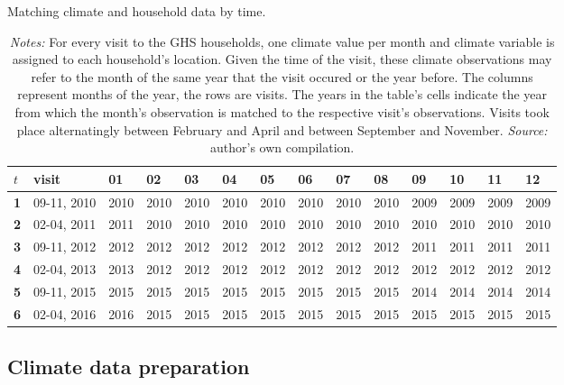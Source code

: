 \documentclass[a4paper,12pt]{article}
\theoremstyle{plain}
\theoremstyle{definition}
\theoremstyle{definition}
\theoremstyle{definition}
\theoremstyle{definition}
\begin{document}
\begin{table}[t!]
    \singlespacing
    \centering
    \caption{Matching climate and household data by time.}
    \caption*{\footnotesize{\textit{Notes:} For every visit to the GHS households, one climate value per month and climate variable is assigned to each household's location. Given the time of the visit, these climate observations may refer to the month of the same year that the visit occured or the year before. The columns represent months of the year, the rows are visits. The years in the table's cells indicate the year from which the month's observation is matched to the respective visit's observations. Visits took place alternatingly between February and April and between September and November. \textit{Source:} author's own compilation.}}
    \begin{tabular}{|p{0.3cm}|p{2.1cm}|p{0.7cm}|p{0.7cm}|p{0.7cm}|p{0.7cm}|p{0.7cm}|p{0.7cm}|p{0.7cm}|p{0.7cm}|p{0.7cm}|p{0.7cm}|p{0.7cm}|p{0.7cm}| }
    \hline
    \raggedright\textbf{$t$} & \textbf{visit} & \textbf{01} & \textbf{02}& \textbf{03}& \textbf{04}& \textbf{05}& \textbf{06}& \textbf{07}& \textbf{08}& \textbf{09}& \textbf{10}& \textbf{11}& \textbf{12} \\
    \hline    
    \textbf{1} & 09-11, 2010 & 2010 & 2010 & 2010 & 2010 & 2010 & 2010 & 2010 & 2010 & 2009 & 2009 & 2009 & 2009\\
    \textbf{2} & 02-04, 2011 & 2011 & 2010 & 2010 & 2010 & 2010 & 2010 & 2010 & 2010 & 2010 & 2010 & 2010 & 2010\\
    \textbf{3} & 09-11, 2012 & 2012 & 2012 & 2012 & 2012 & 2012 & 2012 & 2012 & 2012 & 2011 & 2011 & 2011 & 2011\\
    \textbf{4} & 02-04, 2013 & 2013 & 2012 & 2012 & 2012 & 2012 & 2012 & 2012 & 2012 & 2012 & 2012 & 2012 & 2012\\
    \textbf{5} & 09-11, 2015 & 2015 & 2015 & 2015 & 2015 & 2015 & 2015 & 2015 & 2015 & 2014 & 2014 & 2014 & 2014\\
    \textbf{6} & 02-04, 2016 & 2016 & 2015 & 2015 & 2015 & 2015 & 2015 & 2015 & 2015 & 2015 & 2015 & 2015 & 2015\\
    \hline
    \end{tabular}
    \label{tab:cruvars}
\end{table}

\subsection{Climate data preparation}
\end{document}
